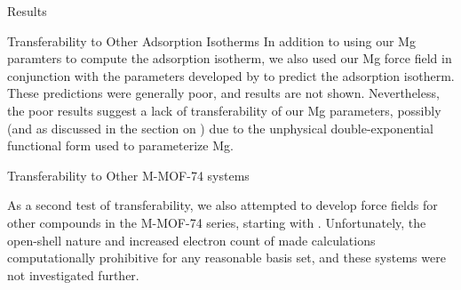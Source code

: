 \begin{section}{Results}
\begin{subsection}{Transferability to Other Adsorption Isotherms}
In addition to using our Mg paramters to compute the \co adsorption isotherm,
we also used our Mg force field in conjunction with the  parameters
developed by \citeauthor{Yu2011}\cite{Yu2011} to predict the 
adsorption isotherm. These predictions were generally poor, and results are
not shown. Nevertheless, the poor  results suggest a lack of
transferability of our Mg parameters, possibly (and as discussed in the
section on ) due to the unphysical double-exponential
functional form used to parameterize Mg.

\end{subsection}
\begin{subsection}{Transferability to Other M-MOF-74 systems}

As a second test of transferability, we also attempted to develop force fields
for other compounds in the M-MOF-74 series, starting with \comof.
Unfortunately, the open-shell nature and increased electron count of \comof
made \lmoeda calculations computationally prohibitive for any reasonable basis
set, and these systems were not investigated further.

\end{subsection}


\end{section}
